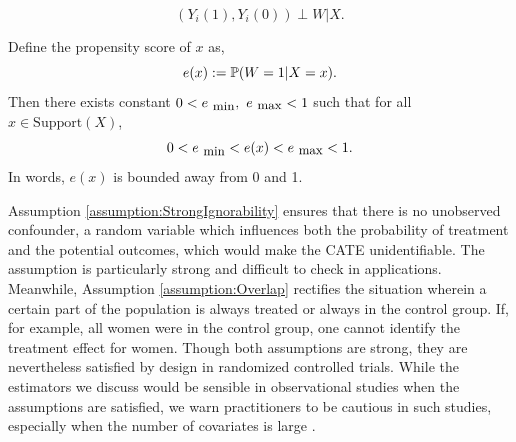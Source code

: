 \begin{assumption} \label{assumption:StrongIgnorability}
$$
    (Y_i(1), Y_i(0)) \perp W |X.     
$$
\end{assumption}
\begin{assumption}[Overlap] \label{assumption:Overlap}
Define the propensity score of $x$ as, 
$$e(x) := \mathbb{P}(W = 1 | X = x).$$ 
Then there exists constant $0< \emin, ~\emax < 1$ such that for all $x \in \mbox{Support}(X)$, 
$$0 < \emin < e(x) < \emax < 1.$$
In words, $e(x)$ is bounded away from 0 and 1.
\end{assumption}
Assumption \ref{assumption:StrongIgnorability} ensures that there is no unobserved confounder, a random variable which influences both the probability of treatment and the potential outcomes, which would make the CATE unidentifiable. The assumption is particularly strong and difficult to check in applications. Meanwhile, Assumption \ref{assumption:Overlap} rectifies the situation wherein a certain part of the population is always treated or always in the control group. If, for example, all women were in the control group, one cannot identify the treatment effect for women. Though both assumptions are strong, they are nevertheless satisfied by design in randomized controlled trials. While the estimators we discuss would be sensible in observational studies when the assumptions are satisfied, we warn practitioners to be cautious in such studies, especially when the number of covariates is large \citep{overlapAlex}.

